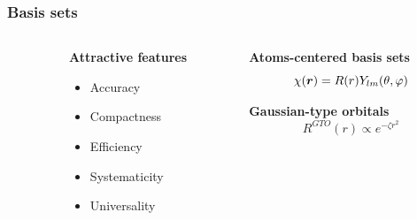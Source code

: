 \begin{frame}
    \frametitle{Basis sets}
    \begin{columns}
    \begin{column}{.10\textwidth}
    \end{column}
    \begin{column}{.30\textwidth}
    \textbf{Attractive features}
    \begin{itemize}
        \item {\color{yellow} Accuracy}
        \item {\color{yellow} Compactness}
        \item {\color{green} Efficiency}
        \item {\color{yellow} Systematicity}
        \item {\color{red} Universality}
    \end{itemize}
    \end{column}
    \begin{column}{.60\textwidth}
    \centering
    \textbf{Atoms-centered basis sets}
    \begin{equation}
        \nonumber
        \chi(\boldsymbol r) = R(r)Y_{lm}(\theta,\varphi)
    \end{equation}
    
    \vspace{4.2mm}

    \textbf{Gaussian-type orbitals}
    \begin{equation}
        \nonumber
        R^{GTO}(r) \propto e^{-\zeta r^2}
    \end{equation}
    \end{column}
    \end{columns}    

    \vspace{5mm}


\end{frame}

